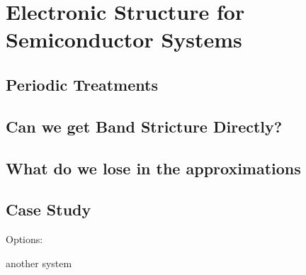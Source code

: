 \chapter{Electronic Structure for Semiconductor Systems}

\section{Periodic Treatments}
\section{Can we get Band Stricture Directly?}
\section{What do we lose in the approximations}
\section{Case Study}
Options:



another system

